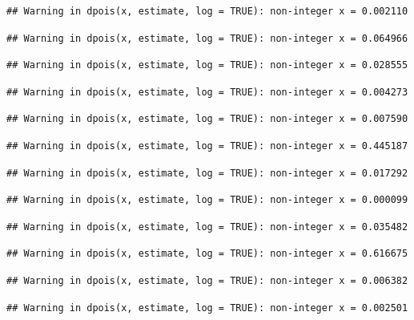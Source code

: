 \documentclass[]{article}
\begin{document}
\begin{verbatim}
## Warning in dpois(x, estimate, log = TRUE): non-integer x = 0.002110
\end{verbatim}

\begin{verbatim}
## Warning in dpois(x, estimate, log = TRUE): non-integer x = 0.064966
\end{verbatim}

\begin{verbatim}
## Warning in dpois(x, estimate, log = TRUE): non-integer x = 0.028555
\end{verbatim}

\begin{verbatim}
## Warning in dpois(x, estimate, log = TRUE): non-integer x = 0.004273
\end{verbatim}

\begin{verbatim}
## Warning in dpois(x, estimate, log = TRUE): non-integer x = 0.007590
\end{verbatim}

\begin{verbatim}
## Warning in dpois(x, estimate, log = TRUE): non-integer x = 0.445187
\end{verbatim}

\begin{verbatim}
## Warning in dpois(x, estimate, log = TRUE): non-integer x = 0.017292
\end{verbatim}

\begin{verbatim}
## Warning in dpois(x, estimate, log = TRUE): non-integer x = 0.000099
\end{verbatim}

\begin{verbatim}
## Warning in dpois(x, estimate, log = TRUE): non-integer x = 0.035482
\end{verbatim}

\begin{verbatim}
## Warning in dpois(x, estimate, log = TRUE): non-integer x = 0.616675
\end{verbatim}

\begin{verbatim}
## Warning in dpois(x, estimate, log = TRUE): non-integer x = 0.006382
\end{verbatim}

\begin{verbatim}
## Warning in dpois(x, estimate, log = TRUE): non-integer x = 0.002501
\end{verbatim}
\end{document}
